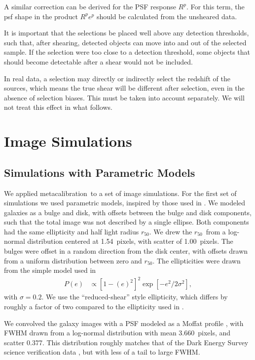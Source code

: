 \documentclass[usegraphicx,usenatbib]{mn2e}
\newcommand{\hlr}{$r_{50}$}
\newcommand{\hlrmean}{1.54}
\newcommand{\hlrwidth}{1.00}
\newcommand{\psffwhmmean}{3.660}
\newcommand{\psffwhmwidth}{0.377}
\newcommand{\mcal}{metacalibration}
\newcommand{\mcalRpsf}{$R^{p}$}
\begin{document}
A similar correction can be derived for the PSF response \mcalRpsf.  For this
term, the psf shape in the product $\mbox{\mcalRpsf} e^p$ should be calculated
from the unsheared data.

It is important that the selections be placed well above any detection
thresholds, such that, after shearing, detected objects can move into and out
of the selected sample.  If the selection were too close to a detection
threshold, some objects that should become detectable after
a shear would not be included.

In real data, a selection may directly or indirectly select the redshift of the
sources, which means the true shear will be different after selection, even
in the absence of selection biases.  This must be taken into account separately. We
will not treat this effect in what follows.


\section{Image Simulations} \label{sec:sims}

\subsection{Simulations with Parametric Models} \label{sec:bdsim}

We applied \mcal\ to a set of image simulations.  For the first set of
simulations we used parametric models, inspired by those used in
\citet{bfd2015}.  We modeled galaxies as a bulge and disk, with offsets between the
bulge and disk components, such that the total image was not described by a
single ellipse.  Both components had the same ellipticity and half light radius
\hlr. We drew the \hlr\ from a log-normal distribution centered at \hlrmean\
pixels, with scatter of \hlrwidth\ pixels.  The bulges were offset in a random
direction from the disk center, with offsets drawn from a uniform distribution
between zero and \hlr.  The ellipticities were drawn from the simple model
used in \cite{ba14}
\begin{align}
    P(e) &\propto \left[1-(e)^2\right]^2 \exp\left[-e^2/2\sigma^2\right],
\end{align}
with $\sigma=0.2$.  We use the ``reduced-shear'' style ellipticity,
which differs by roughly a factor of two compared to the ellipticity used
in \citet{bfd2015}.

We convolved the galaxy images with a PSF modeled as a Moffat profile
\citep{Moffat1969}, with FWHM drawn from a log-normal distribution with mean
\psffwhmmean\ pixels, and scatter \psffwhmwidth. This distribution roughly
matches that of the Dark Energy Survey science verification data
\citep[][(DES)]{DESSVShear}, but with less of a tail to large FWHM.
\end{document}

